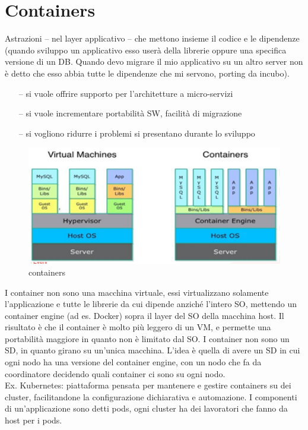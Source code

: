 \documentclass[12pt,italian]{report}
\begin{document}
\section{Containers}
Astrazioni – nel layer applicativo – che mettono insieme il codice e le dipendenze (quando sviluppo un applicativo esso userà della librerie oppure una specifica versione di un DB. Quando devo migrare il mio applicativo su un altro server non è detto che esso abbia tutte le dipendenze che mi servono, porting da incubo).
\begin{itemize}
    \item [--] si vuole offrire supporto per l'architetture a micro-servizi
    \item [--] si vuole incrementare portabilità SW, facilità di migrazione
    \item [--] si vogliono ridurre i problemi si presentano durante lo sviluppo
\end{itemize}
\begin{figure}[h]
\centering
\includegraphics[width=130mm]{img/container.png}
\caption{containers}
\label{fig:conta}
\end{figure}
I container non sono una macchina virtuale, essi virtualizzano solamente l’applicazione e tutte le librerie da cui dipende anziché l’intero SO, mettendo un container engine (ad es. Docker) sopra il layer del SO della macchina host. Il risultato è che il container è molto più leggero di un VM, e permette una portabilità maggiore in quanto non è limitato dal SO. I container non sono un SD, in quanto girano su un’unica macchina. L’idea è quella di avere un SD in cui ogni nodo ha una versione del container engine, con un nodo che fa da coordinatore decidendo quali container ci sono su ogni nodo. \\
Ex. Kubernetes: piattaforma pensata per mantenere e gestire containers su dei cluster, facilitandone la configurazione dichiarativa e automazione. I componenti di un'applicazione sono detti pods, ogni cluster ha dei lavoratori che fanno da host per i pods.
\end{document}
